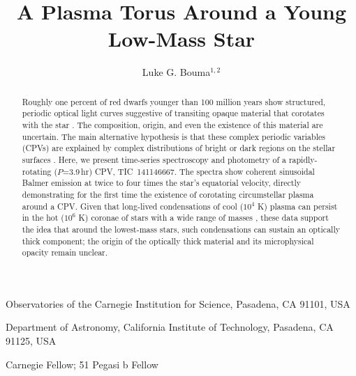\documentclass{nature3}
\title{A Plasma Torus Around a Young Low-Mass Star}
\newcommand{\carnegie}{Observatories of the Carnegie Institution for Science, Pasadena, CA 91101, USA}
\newcommand{\caltech}{Department of Astronomy, California Institute of Technology, Pasadena, CA 91125, USA}
\begin{document}
\author{Luke G. Bouma$^{1,2}$}

\maketitle

\scriptsize
\begin{affiliations}
\item \carnegie
\item \caltech
\item Carnegie Fellow; 51 Pegasi b Fellow
\end{affiliations}
\normalsize


\begin{abstract}
\normalfont
Roughly one percent of red dwarfs younger than 100 million years show
structured, periodic optical light curves suggestive of transiting
opaque material that corotates with the star
\cite{Rebull2016,Stauffer2017,Rebull2018,Bouma2024}.  The
composition, origin, and even the existence of this material are
uncertain. The main alternative hypothesis is that these complex
periodic variables (CPVs) are explained by complex distributions of
bright or dark regions on the stellar surfaces \cite{Koen2021}.
Here, we present time-series spectroscopy and photometry of a
rapidly-rotating ($P$=3.9\,hr) CPV, TIC~141146667. The spectra show
coherent sinusoidal Balmer emission at twice to four times the
star's equatorial velocity, directly demonstrating for the first
time the existence of corotating circumstellar plasma around a CPV.
Given that long-lived condensations of cool ($10^4$ K) plasma can
persist in the hot ($10^6$ K) coronae of stars with a wide range of
masses \cite{CollierCameron1989,Townsend2005,Dunstone2006,Petit2013,Waugh2022,Daley-Yates2024},
these data support the idea that around the lowest-mass stars, such
condensations can sustain an optically thick component; the origin
of the optically thick material and its microphysical opacity remain
unclear.
\end{abstract}

\maketitle

\end{document}

